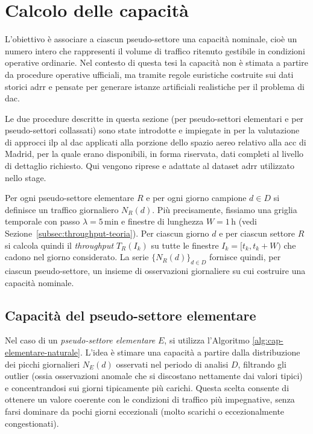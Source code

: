 \section{Calcolo delle capacità}
\label{sec:cap5-capacita}
L'obiettivo è associare a ciascun pseudo-settore una capacità nominale, cioè un numero intero che rappresenti il volume di traffico ritenuto gestibile in condizioni operative ordinarie.  
Nel contesto di questa tesi la capacità non è stimata a partire da procedure operative ufficiali, ma tramite regole euristiche costruite sui dati storici \gls{adrr} e pensate per generare istanze artificiali realistiche per il problema di \gls{dac}.  

Le due procedure descritte in questa sezione (per pseudo-settori elementari e per pseudo-settori collassati) sono state introdotte e impiegate in \cite{galeazzo2024integer} per la valutazione di approcci \gls{ilp} al \gls{dac} applicati alla porzione dello spazio aereo relativo alla \gls{acc} di Madrid, per la quale erano disponibili, in forma riservata, dati completi al livello di dettaglio richiesto. Qui vengono riprese e adattate al dataset \gls{adrr} utilizzato nello stage.

Per ogni pseudo-settore elementare \(R\) e per ogni giorno campione \(d \in D\) si definisce un traffico giornaliero \(N_R(d)\).  
Più precisamente, fissiamo una griglia temporale con passo \(\lambda = 5\,\mathrm{min}\) e finestre di lunghezza \(W = 1\,\mathrm{h}\) (vedi Sezione~\ref{subsec:throughput-teoria}). Per ciascun giorno \(d\) e per ciascun settore \(R\) si calcola quindi il \emph{throughput} \(T_R(I_k)\) su tutte le finestre \(I_k = [t_k, t_k+W)\) che cadono nel giorno considerato. La serie \(\{N_R(d)\}_{d \in D}\) fornisce quindi, per ciascun pseudo-settore, un insieme di osservazioni giornaliere su cui costruire una capacità nominale.

    \subsection{Capacità del pseudo-settore elementare}
    Nel caso di un \emph{pseudo-settore elementare} \(E\), si utilizza l'Algoritmo \ref{alg:cap-elementare-naturale}. L'idea è stimare una capacità a partire dalla distribuzione dei picchi giornalieri \(N_E(d)\) osservati nel periodo di analisi \(D\), filtrando gli outlier (ossia osservazioni anomale che si discostano nettamente dai valori tipici) e concentrandosi sui giorni tipicamente più carichi.  
Questa scelta consente di ottenere un valore coerente con le condizioni di traffico più impegnative, senza farsi dominare da pochi giorni eccezionali (molto scarichi o eccezionalmente congestionati).

